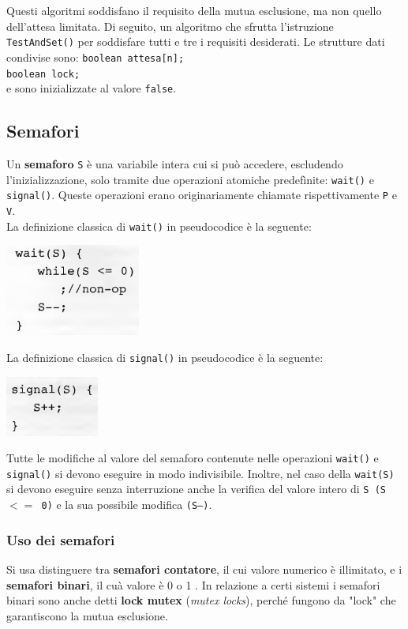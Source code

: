 \documentclass[11pt,a4paper]{article}
\begin{document}
%
Questi algoritmi soddisfano il requisito della mutua esclusione, ma non quello dell'atte­sa limitata.
Di seguito, un algoritmo che sfrutta l'istruzione \texttt{TestAndSet()}
per soddisfare tutti e tre i requisiti desiderati. Le strutture dati condivise sono:
\texttt{boolean attesa[n];}\\
\texttt{boolean lock;}\\
e sono inizializzate al valore \texttt{false}.

\subsection{Semafori}
Un \textbf{semaforo} \texttt{S} è una variabile intera cui si può accedere, escludendo l'inizializzazione,
solo tramite due operazioni atomiche predefìnite: \texttt{wait()} e \texttt{signal()}. Queste operazioni
erano originariamente chiamate rispettivamente \texttt{P} e \texttt{V}.\\
La definizione classica di \texttt{wait()} in pseudocodice
è la seguente:
\begin{center}
  \includegraphics[scale=0.6]{img/0028.png}
\end{center}
La definizione classica di \texttt{signal()} in pseudocodice è la seguente:
\begin{center}
  \includegraphics[scale=0.6]{img/0029.png}
\end{center}
%
Tutte le modifiche al valore del semaforo contenute nelle operazioni \texttt{wait()} e \texttt{signal()}
si devono eseguire in modo indivisibile. Inoltre, nel
caso della \texttt{wait(S)} si devono eseguire senza interruzione anche la verifica del valore intero
di \texttt{S (S $<=$ 0)} e la sua possibile modifica \texttt{(S--)}.

\subsubsection{Uso dei semafori}
Si usa distinguere tra \textbf{semafori contatore}, il cui valore numerico è illimitato, e i \textbf{semafori bi­nari}, il cuà valore è 0 o 1 . In relazione a certi sistemi i semafori binari sono anche detti \textbf{lock mutex} (\emph{mutex locks}), perché fungono da "lock" che garantiscono la mutua esclusione.
\end{document}
